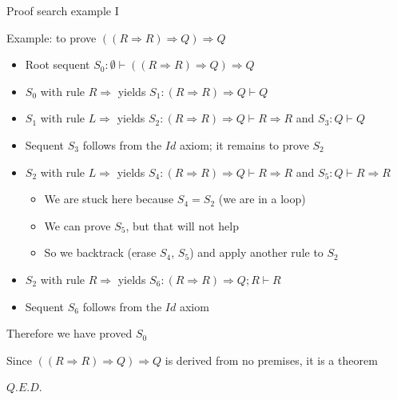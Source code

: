 \documentclass[english]{beamer}
\begin{document}
\begin{frame}{Proof search example I}

Example: to prove $\left(\left(R\Rightarrow R\right)\Rightarrow Q\right)\Rightarrow Q$
\begin{itemize}
\item Root sequent $S_{0}:\emptyset\vdash\left(\left(R\Rightarrow R\right)\Rightarrow Q\right)\Rightarrow Q$
\item $S_{0}$ with rule $R\Rightarrow$ yields $S_{1}:\left(R\Rightarrow R\right)\Rightarrow Q\vdash Q$
\item $S_{1}$ with rule $L\Rightarrow$ yields $S_{2}:\left(R\Rightarrow R\right)\Rightarrow Q\vdash R\Rightarrow R$
and $S_{3}:Q\vdash Q$
\item Sequent $S_{3}$ follows from the $Id$ axiom; it remains to prove
$S_{2}$
\item $S_{2}$ with rule $L\Rightarrow$ yields $S_{4}:\left(R\Rightarrow R\right)\Rightarrow Q\vdash R\Rightarrow R$
and $S_{5}:Q\vdash R\Rightarrow R$
\begin{itemize}
\item We are stuck here because $S_{4}=S_{2}$ (we are in a loop)
\item We can prove $S_{5}$, but that will not help
\item So we backtrack (erase $S_{4}$, $S_{5}$) and apply another rule
to $S_{2}$
\end{itemize}
\item $S_{2}$ with rule $R\Rightarrow$ yields $S_{6}:\left(R\Rightarrow R\right)\Rightarrow Q;R\vdash R$
\item Sequent $S_{6}$ follows from the $Id$ axiom
\end{itemize}
Therefore we have proved $S_{0}$

Since $\left(\left(R\Rightarrow R\right)\Rightarrow Q\right)\Rightarrow Q$
is derived from no premises, it is a theorem

$Q.E.D.$
\end{frame}
\end{document}
